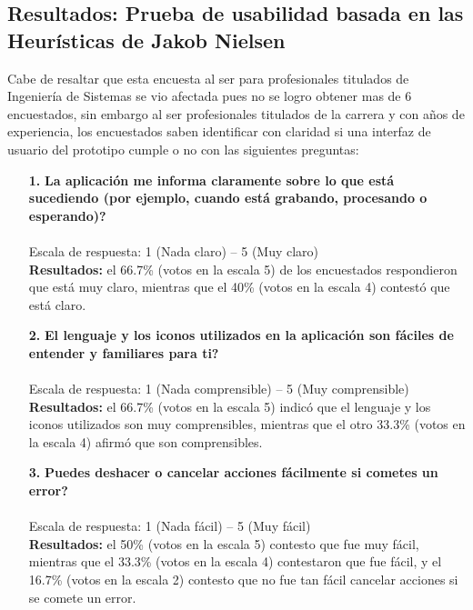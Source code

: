 \subsection{Resultados: Prueba de usabilidad basada en las Heurísticas de Jakob Nielsen}

Cabe de resaltar que esta encuesta al ser para profesionales titulados de Ingeniería de Sistemas se vio afectada pues no se logro obtener mas de 6 encuestados, sin embargo al ser profesionales titulados de la carrera y con años de experiencia, los encuestados saben identificar con claridad si una interfaz de usuario del prototipo cumple o no con las siguientes preguntas:


\begin{enumerate}

\item[\textbf{1.}] \textbf{\textquestiondown La aplicación me informa claramente sobre lo que está sucediendo (por ejemplo, cuando está grabando, procesando o esperando)?} \\\\
Escala de respuesta: 1 (Nada claro) -- 5 (Muy claro)\\

\textbf{Resultados: } el 66.7\% (votos en la escala 5) de los encuestados respondieron que está muy claro, mientras que el 40\% (votos en la escala 4) contestó que está claro.
 \\

\item[\textbf{2.}] \textbf{\textquestiondown El lenguaje y los iconos utilizados en la aplicación son fáciles de entender y familiares para ti?} \\\\
Escala de respuesta: 1 (Nada comprensible) -- 5 (Muy comprensible)\\

\textbf{Resultados: } el 66.7\% (votos en la escala 5) indicó que el lenguaje y los iconos utilizados son muy comprensibles, mientras que el otro 33.3\% (votos en la escala 4) afirmó que son comprensibles.
\\

\item[\textbf{3.}] \textbf{\textquestiondown Puedes deshacer o cancelar acciones fácilmente si cometes un error?} \\\\
Escala de respuesta: 1 (Nada fácil) -- 5 (Muy fácil)\\

\textbf{Resultados: } el 50\% (votos en la escala 5) contesto que fue muy fácil, mientras que el 33.3\% (votos en la escala 4) contestaron que fue fácil, y el 16.7\% (votos en la escala 2) contesto que no fue tan fácil cancelar acciones si se comete un error.
\\


\end{enumerate}
